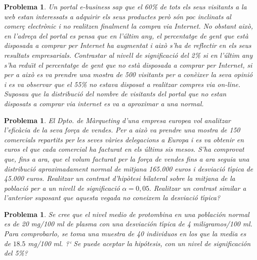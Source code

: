 \documentclass[11pt]{article}
\newcounter{prbcont}
\newtheorem{problema}[prbcont]{Problema}
\begin{document}
\begin{problema}
Un portal e-business sap que el 60\% de tots els seus visitants a la web estan interessats a adquirir els seus productes per\`o s\'on poc inclinats al comer\c{c} electr\`onic i no realitzen finalment la compra via Internet. No obstant aix\`o, en l'adre\c{c}a del portal es pensa que en l'\'ultim any, el percentatge de gent que est\`a disposada a comprar per Internet ha augmentat i aix\`o s'ha de reflectir en els seus resultats empresarials. Contrastar al nivell de significaci\'o del 2\% si en l'\'ultim any s'ha redu\"{\i}t el percentatge de gent que no est\`a disposada a comprar per Internet, si per a aix\`o es va prendre una mostra de 500 visitants per a con\`eixer la seva opini\'o i es va observar que el 55\% no estava disposat a realitzar compres via on-line. 
Suposau que la distribuci\'o del nombre de visitants del portal que no estan disposats a comprar via internet es va a aproximar a una normal.
\end{problema}


\begin{problema}
El Dpto. de M\`arqueting d'una empresa europea vol analitzar l'efic\`acia de la seva for\c{c}a de vendes. Per a aix\`o va prendre una mostra de 150 comercials repartits per les seves v\`aries delegacions a Europa i es va obtenir en euros el que cada comercial ha facturat en els \'ultims sis mesos. S'ha comprovat que, fins a ara, que el volum facturat per la for\c{c}a de vendes fins a ara seguia una distribuci\'o aproximadament normal de mitjana 165.000 euros i desviaci\'o t\'{\i}pica de 45.000 euros. Realitzar un contrast d'hip\`otesi bilateral sobre la mitjana de la poblaci\'o per a un nivell de significaci\'o $\alpha=0,05.$ Realitzar un contrast similar a l'anterior suposant que aquesta vegada no coneixem la desviaci\'o t\'{\i}pica? 
\end{problema}


\begin{problema}
Se cree que el nivel medio de protombina en una poblaci\'on normal es de 20 mg/100 ml de plasma con una desviaci\'on t\'{\i}pica de 4 miligramos/100 ml. Para comprobarlo, se toma una muestra de 40 individuos en los que la media es de $18.5$ mg/100 ml. ?` Se puede aceptar la hip\'otesis, con un nivel de significaci\'on del 5\%? 
\end{problema}
\end{document}

